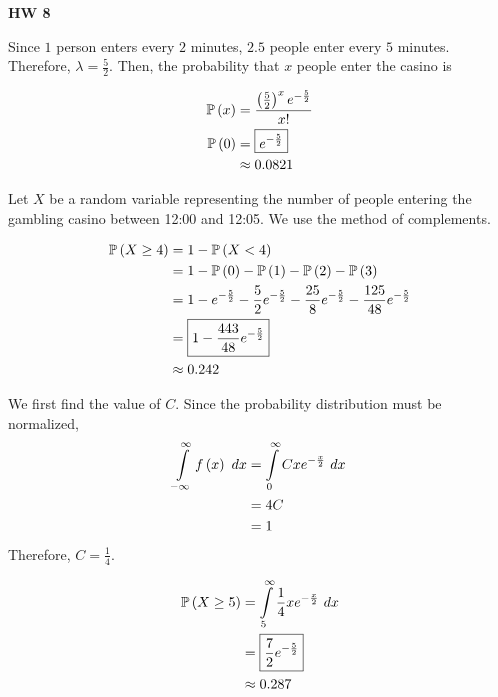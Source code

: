 \documentclass{article}
\begin{document}
\begin{center}
  \Large \textbf{HW 8}
\end{center}

\setcounter{problem}{65}

\problem{}
\subproblema{}
Since $1$ person enters every $2$ minutes,
$2.5$ people enter every $5$ minutes.
Therefore,
$\lambda = \frac{5}{2}$.
Then, the probability that $x$ people enter the casino is

\begin{align*}
  \mathbb{P} \left ( x \right) &= \frac{\left (\frac{5}{2} \right)^x e^{- \frac{5}{2}}}{x!} \\
  \mathbb{P} \left ( 0 \right) &= \boxed{e^{-\frac{5}{2}}} \\
         & \approx 0.0821 \\
\end{align*}

\subproblema{}
Let $X$ be a random variable representing the number of people entering the gambling casino between 12:00 and 12:05.
We use the method of complements.

\begin{align*}
  \mathbb{P} \left ( X \geq 4 \right) &= 1 - \mathbb{P} \left ( X < 4 \right) \\
                &= 1 - \mathbb{P} \left ( 0 \right) - \mathbb{P} \left ( 1 \right) - \mathbb{P} \left ( 2 \right) - \mathbb{P} \left ( 3 \right) \\
                &= 1 - e^{-\frac{5}{2}} - \frac{5}{2} e^{-\frac{5}{2}} - \frac{25}{8} e^{-\frac{5}{2}} - \frac{125}{48} e^{-\frac{5}{2}} \\
                &= \boxed{1 - \frac{443}{48} e^{-\frac{5}{2}}} \\
                & \approx 0.242 \\
\end{align*}

\setcounter{problem}{1}

\problem{}
We first find the value of $C$.
Since the probability distribution must be normalized,
\begin{align*}
  \int \limits_{-\infty}^{\infty} f \left (x \right)\ dx &= \int \limits_{0}^{\infty} C x e^{- \frac{x}{2}}\ dx \\
                                                 &= 4 C \\
                                                 &= 1 \\
\end{align*}
Therefore, $C = \frac{1}{4}$.


\begin{align*}
  \mathbb{P} \left ( X \geq 5 \right) &= \int \limits_{5}^{\infty} \frac{1}{4} x e^{- \frac{x}{2}}\ dx \\
                &= \boxed{\frac{7}{2} e^{- \frac{5}{2}}} \\
                & \approx 0.287 \\
\end{align*}
\end{document}
